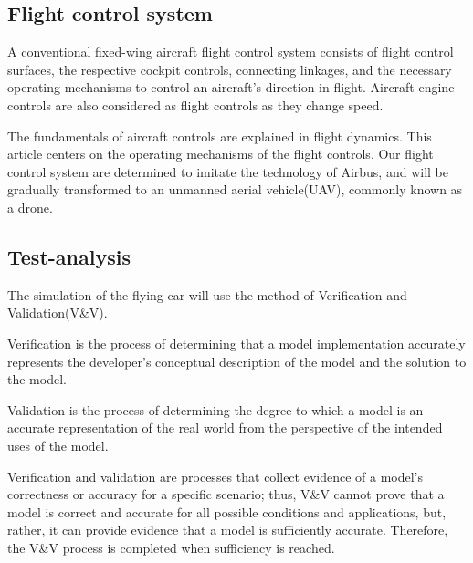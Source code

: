 \subsection{Flight control system}

A conventional fixed-wing aircraft flight control system consists of flight control surfaces, the respective cockpit controls, connecting linkages, and the necessary operating mechanisms to control an aircraft's direction in flight. Aircraft engine controls are also considered as flight controls as they change speed.

The fundamentals of aircraft controls are explained in flight dynamics. This article centers on the operating mechanisms of the flight controls. Our flight control system are determined to imitate the technology of Airbus, and will be gradually transformed to an unmanned aerial vehicle(UAV), commonly known as a drone.

\subsection{Test-analysis}

The simulation of the flying car will use the method of Verification and Validation(V\&V).

Verification is the process of determining that a model implementation accurately represents the developer’s conceptual description of the model and the solution to the model.

Validation is the process of determining the degree to which a model is an accurate representation of the real world from the perspective of the intended uses of the model.

Verification and validation are processes that collect evidence of a model’s correctness or accuracy for a specific scenario; thus, V\&V cannot prove that a model is correct and accurate for all possible conditions and applications, but, rather, it can provide evidence that a model is sufficiently accurate. Therefore, the V\&V process is completed when sufficiency is reached.